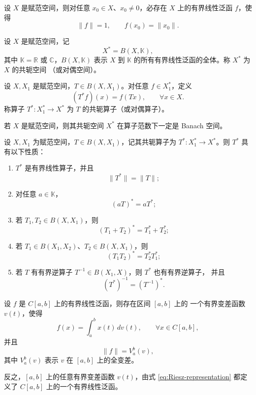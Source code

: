 \begin{corollary}\label{cor:HB-norm1}
设 $X$ 是赋范空间，则对任意 $x_0\in X$、$x_0\neq0$，必存在
$X$ 上的有界线性泛函 $f$，使得
\[
\|f\|=1,\qquad f(x_0)=\|x_0\|.
\]
\end{corollary}
\begin{definition}
设 $X$ 是赋范空间，记
\[
X^* = B(X,\mathbb K),
\]
其中 $\mathbb K=\mathbb R$ 或 $\mathbb C$，$B(X,\mathbb K)$ 表示
$X$ 到 $\mathbb K$ 的所有有界线性泛函的全体。称 $X^*$ 为 $X$ 的共轭空间
（或对偶空间）。
\end{definition}

\begin{definition}
设 $X,X_1$ 是赋范空间，$T\in B(X,X_1)$。对任意 $f\in X_1^*$，定义
\[
(T^* f)(x) = f(Tx),\qquad \forall x\in X.
\]
称算子 $T^*:X_1^*\to X^*$ 为 $T$ 的共轭算子（或对偶算子）。
\end{definition}

\begin{proposition}
若 $X$ 是赋范空间，则其共轭空间 $X^*$ 在算子范数下一定是 Banach 空间。
\end{proposition}
\begin{theorem}[有界线性算子的共轭算子的性质]\label{thm:adjoint-properties}
设 $X,X_1$ 为赋范空间，$T\in B(X,X_1)$，记其共轭算子为
$T^*:X_1^*\to X^*$。则 $T^*$ 具有以下性质：
\begin{enumerate}
  \item $T^*$ 是有界线性算子，并且
        \[
        \|T^*\|=\|T\|;
        \]
  \item 对任意 $a\in\mathbb K$，
        \[
        (aT)^* = aT^*;
        \]
  \item 若 $T_1,T_2\in B(X,X_1)$，则
        \[
        (T_1+T_2)^* = T_1^* + T_2^*;
        \]
  \item 若 $T_1\in B(X_1,X_2)$、$T_2\in B(X,X_1)$，则
        \[
        (T_1T_2)^* = T_2^*T_1^*;
        \]
  \item 若 $T$ 有有界逆算子 $T^{-1}\in B(X_1,X)$，则 $T^*$ 也有有界逆算子，
        并且
        \[
        (T^*)^{-1} = (T^{-1})^*.
        \]
\end{enumerate}
\end{theorem}
\begin{theorem}[F.\ Riesz]\label{thm:Riesz-Cab}
设 $f$ 是 $C[a,b]$ 上的有界线性泛函，则存在区间 $[a,b]$ 上的
一个有界变差函数 $v(t)$，使得
\begin{equation}\label{eq:Riesz-representation}
    f(x)=\int_a^b x(t)\,dv(t),\qquad \forall x\in C[a,b],
\end{equation}
并且
\[
    \|f\| = V_a^b(v),
\]
其中 $V_a^b(v)$ 表示 $v$ 在 $[a,b]$ 上的全变差。

反之，$[a,b]$ 上的任意有界变差函数 $v(t)$，由式
\eqref{eq:Riesz-representation} 都定义了 $C[a,b]$ 上的一个有界线性泛函。
\end{theorem}

